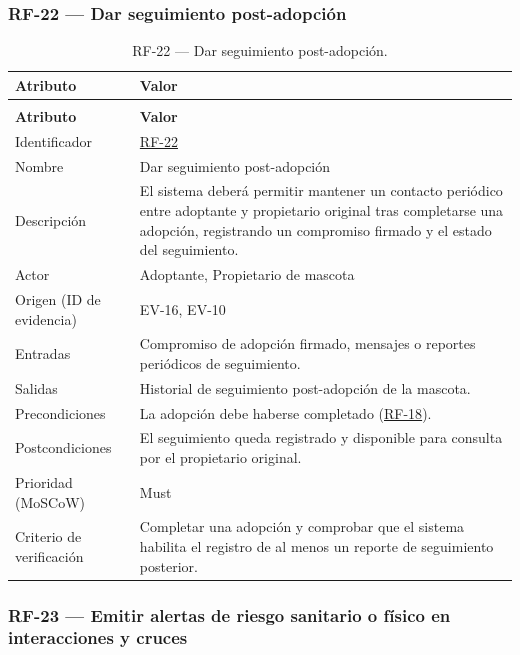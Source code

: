 \documentclass[journal,onecolumn]{IEEEtran}
\makeatletter
\newenvironment{atributos}[2]{%
	\small
	\begin{longtable}{@{}>{\raggedright\arraybackslash}p{4.2cm} >{\raggedright\arraybackslash}p{11.2cm}@{}}
		\caption{#2}\label{tab:#1}\\
		\toprule
		\textbf{Atributo} & \textbf{Valor} \\
		\midrule
		\endfirsthead
		\multicolumn{2}{@{}l}{\small\itshape (continuación)}\\
		\toprule
		\textbf{Atributo} & \textbf{Valor} \\
		\midrule
		\endhead
		\bottomrule
		\endlastfoot
	}{%
	\end{longtable}
	\normalsize
}
\makeatother
\begin{document}
	\subsubsection{RF-22 --- Dar seguimiento post-adopción}
	
	\begin{atributos}{RF-22}{RF-22 --- Dar seguimiento post-adopción.}
		Identificador & \hyperref[tab:RF-22]{RF-22} \\
		Nombre & Dar seguimiento post-adopción \\
		Descripción & El sistema deberá permitir mantener un contacto periódico entre adoptante y propietario original tras completarse una adopción, registrando un compromiso firmado y el estado del seguimiento. \\
		Actor & Adoptante, Propietario de mascota \\
		Origen (ID de evidencia) & EV-16, EV-10 \\
		Entradas & Compromiso de adopción firmado, mensajes o reportes periódicos de seguimiento. \\
		Salidas & Historial de seguimiento post-adopción de la mascota. \\
		Precondiciones & La adopción debe haberse completado (\hyperref[tab:RF-18]{RF-18}). \\
		Postcondiciones & El seguimiento queda registrado y disponible para consulta por el propietario original. \\
		Prioridad (MoSCoW) & Must \\
		Criterio de verificación & Completar una adopción y comprobar que el sistema habilita el registro de al menos un reporte de seguimiento posterior. \\
	\end{atributos}
	
	\subsubsection{RF-23 --- Emitir alertas de riesgo sanitario o físico en interacciones y cruces}
	
\end{document}
